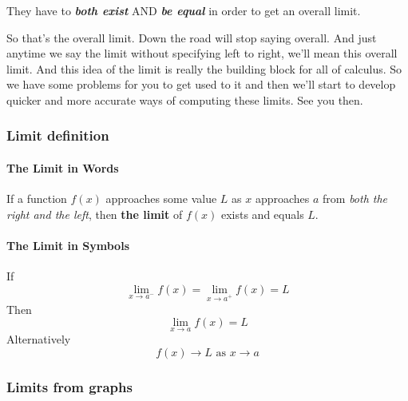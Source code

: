 \documentclass[pdftex, brazil, 12pt, twoside]{article}
\begin{document}
They have to \emph{\textbf{both exist}} AND \emph{\textbf{be equal}} in order
to get an overall limit.

So that's the overall limit.
Down the road will stop saying overall.
And just anytime we say the limit
without specifying left to right,
we'll mean this overall limit.
And this idea of the limit is really the building block
for all of calculus.
So we have some problems for you to get used to it
and then we'll start to develop quicker and more accurate
ways of computing these limits.
See you then.

\subsubsection{Limit definition}
\label{u0-intro-definition}

\paragraph{The Limit in Words}
If a function $f(x)$ approaches some value $L$ as $x$ approaches $a$ from
\emph{both the right and the left}, then \textbf{the limit} of $f(x)$ exists and equals $L$.

\paragraph{The Limit in Symbols}
If
\begin{equation}
  \lim_{x \to a^{-}}f(x) = \lim_{x \to a^{+}}f(x) = L
\end{equation}
Then
\begin{equation}
  \lim_{x \to a}f(x) = L
\end{equation}
Alternatively
\begin{equation}
  f(x) \to L \text{ as } x \to a
\end{equation}
    
\subsubsection{Limits from graphs}
\label{u0-intro-graphs}
\end{document}
